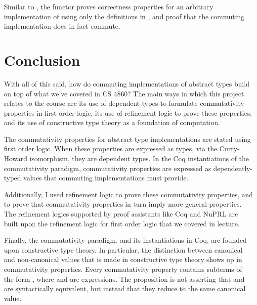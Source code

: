 \documentclass[12pt]{article}
\begin{document}
  \noindent Similar to , the  functor proves correctness properties for an arbitrary implementation of  using only the definitions in , and proof that the commuting implementation does in fact commute.

\section{Conclusion}


  With all of this said, how do commuting implementations of abstract types build on top of what we've covered in CS 4860? The main ways in which this project relates to the course are its use of dependent types to formulate commutativity properties in first-order-logic, its use of refinement logic to prove these properties, and its use of constructive type theory as a foundation of computation.

  \bigskip

  \noindent The commutativity properties for abstract type implementations are stated using first order logic. When these properties are expressed as types, via the Curry-Howard isomorphism, they are dependent types. In the Coq instantiations of the commutativity paradigm, commutativity properties are expressed as dependently-typed values that commuting implementations must provide.

  \bigskip

  \noindent Additionally, I used refinement logic to prove these commutativity properties, and to prove that commutativity properties in turn imply more general properties. The refinement logics supported by proof assistants like Coq and NuPRL are built upon the refinement logic for first order logic that we covered in lecture.

  \bigskip

  \noindent Finally, the commutativity paradigm, and its instantiations in Coq, are founded upon constructive type theory. In particular, the distinction between canonical and non-canonical values that is made in constructive type theory shows up in commutativity properties. Every commutativity property contains subterms of the form , where  and  are expressions. The proposition  is not asserting that  and  are syntactically equivalent, but instead that they reduce to the same canonical value.
\end{document}
